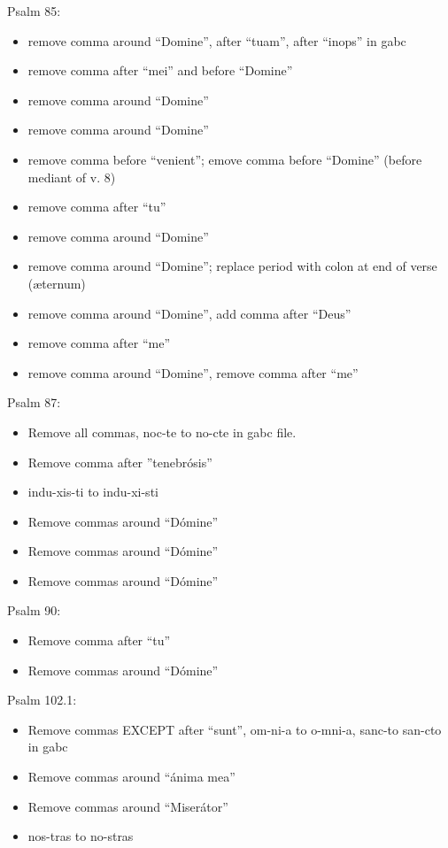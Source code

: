 \documentclass[11pt]{article}
\begin{document}
 Psalm 85:
  \begin{itemize}
  \item remove comma around ``Domine'', after ``tuam'',  after ``inops'' in gabc
    \item
   remove comma after ``mei'' and before ``Domine''
  \item
   remove comma around ``Domine''
     \item
   remove comma around ``Domine''
     \item  remove comma before ``venient''; emove comma before ``Domine'' (before mediant of v. 8) 
      \item  remove comma after ``tu''
        \item
   remove comma around ``Domine''
     \item
   remove comma around ``Domine''; replace period with colon at end of verse (æternum)
           \item
   remove comma around ``Domine'', add comma after ``Deus''
    \item  remove comma after ``me''
       \item  remove comma around ``Domine'', remove comma after ``me''
       \end{itemize}

 Psalm 87:
  \begin{itemize}
  \item Remove all commas, noc-te to no-cte in gabc file.
  \item
 Remove comma after ''tenebrósis''
  \item  indu-xis-ti to indu-xi-sti
  \item Remove commas around ``Dómine''
    \item Remove commas around ``Dómine''
      \item Remove commas around ``Dómine''
    \end{itemize}

 Psalm 90:
  \begin{itemize}
    \item  Remove comma after ``tu''
  \item Remove commas around ``Dómine''
    \end{itemize}

 Psalm 102.1:
  \begin{itemize}
  \item Remove commas EXCEPT after ``sunt'', om-ni-a to o-mni-a, sanc-to san-cto in gabc
   \item Remove commas around ``ánima mea''
    \item Remove commas around ``Miserátor''
  \item  nos-tras to no-stras
    \end{itemize}
\end{document}
